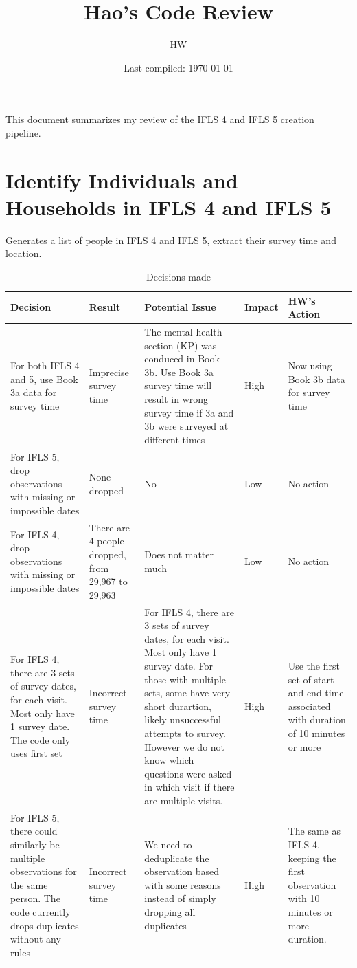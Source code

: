 \documentclass[11pt]{article}
\title{Hao's Code Review}
\author{HW}
\date{Last compiled: \today}
\begin{document}
\maketitle

This document summarizes my review of the IFLS 4 and IFLS 5 creation pipeline.


\section{Identify Individuals and Households in IFLS 4 and IFLS 5}

Generates a list of people in IFLS 4 and IFLS 5, extract their survey time and location.

\begin{table}[h]
\centering
\caption{Decisions made}
\begin{tabularx}{\textwidth}{L{3cm} L{2cm} X L{1.5cm} L{3cm}}
\toprule
\textbf{Decision} & \textbf{Result} & \textbf{Potential Issue} & \textbf{Impact} & \textbf{HW's Action} \\
\midrule
For both IFLS 4 and 5, use Book 3a data for survey time & Imprecise survey time & The mental health section (KP) was conduced in Book 3b. Use Book 3a survey time will result in wrong survey time if 3a and 3b were surveyed at different times & High & Now using Book 3b data for survey time\\
\addlinespace
For IFLS 5, drop observations with missing or impossible dates & None dropped & No & Low & No action \\
\addlinespace
For IFLS 4, drop observations with missing or impossible dates & There are 4 people dropped, from 29{,}967 to 29{,}963 & Does not matter much & Low & No action \\
\addlinespace
For IFLS 4, there are 3 sets of survey dates, for each visit. Most only have 1 survey date. 
The code only uses first set & Incorrect survey time & For IFLS 4, there are 3 sets of survey dates, for each visit. Most only have 1 survey date. For those with multiple sets, some have very short durartion, likely unsuccessful attempts to survey. However we do not know which questions were asked in which visit if there are multiple visits. & High & Use the first set of start and end time associated with duration of 10 minutes or more \\
\addlinespace
For IFLS 5, there could similarly be multiple observations for the same person. The code currently drops duplicates without any rules & Incorrect survey time & We need to deduplicate the observation based with some reasons instead of simply dropping all duplicates & High & The same as IFLS 4, keeping the first observation with 10 minutes or more duration. \\
\bottomrule
\end{tabularx}
\end{table}
\end{document}
